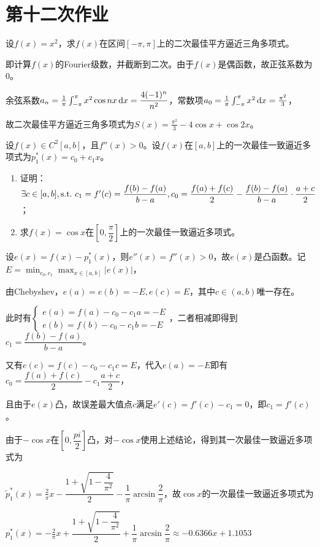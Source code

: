 \chapter{第十二次作业}

    \begin{homework}[5pts]
        设$f(x)=x^2$，求$f(x)$在区间$[-\pi,\pi]$上的二次最佳平方逼近三角多项式。
    \end{homework}

    \begin{solution}
        即计算$f(x)$的Fourier级数，并截断到二次。由于$f(x)$是偶函数，故正弦系数为0。

        余弦系数$a_n=\frac1{\pi}\int_{-\pi}^{\pi}x^2\cos nx \mathop{}\!\mathrm{d} x=\dfrac{4(-1)^n}{n^2}$，常数项$a_0=\frac1{\pi}\int_{-\pi}^{\pi}x^2\mathop{}\!\mathrm{d} x=\frac{\pi^2}{3}$，

        故二次最佳平方逼近三角多项式为$S(x)=\frac{\pi^2}3-4\cos x+\cos 2x$。
    \end{solution}

    \begin{homework}[10pts]
        设$f(x)\in C^2[a,b]$，且$f''(x)>0$。设$f(x)$在$[a,b]$上的一次最佳一致逼近多项式为$p_1^*(x)=c_0+c_1 x$。
        \begin{enumerate}
            \item 证明：$\exists c\in[a,b],\text{s.t.\,\,} c_1=f'(c)=\dfrac{f(b)-f(a)}{b-a},c_0=\dfrac{f(a)+f(c)}{2}-\dfrac{f(b)-f(a)}{b-a}\cdot\dfrac{a+c}{2}$；
            \item 求$f(x)=\cos x$在$\left[0,\dfrac{\pi}{2}\right]$上的一次最佳一致逼近多项式。
        \end{enumerate}
    \end{homework}

    \begin{solution}
        设$e(x)=f(x)-p_1^*(x)$，则$e''(x)=f''(x)>0$，故$e(x)$是凸函数。记$E=\min_{c_0,c_1}\max_{x\in[a,b]}|e(x)|$，

        由Chebyshev，$e(a)=e(b)=-E,e(c)=E$，其中$c\in(a,b)$唯一存在。

        此时有$\begin{cases}e(a)=f(a)-c_0-c_1 a=-E\\e(b)=f(b)-c_0-c_1 b=-E\end{cases}$，二者相减即得到$c_1=\dfrac{f(b)-f(a)}{b-a}$。

        又有$e(c)=f(c)-c_0-c_1 c=E$，代入$e(a)=-E$即有$c_0=\dfrac{f(a)+f(c)}{2}-c_1\dfrac{a+c}{2}$，

        且由于$e(x)$凸，故误差最大值点$c$满足$e'(c)=f'(c)-c_1=0$，即$c_1=f'(c)$。

        由于$-\cos x$在$[0,\dfrac{pi}2]$凸，对$-\cos x$使用上述结论，得到其一次最佳一致逼近多项式为

        $\tilde{p}_1^*(x)=\frac2{\pi}x-\dfrac{1+\sqrt{1-\dfrac{4}{\pi^2}}}2-\dfrac1{\pi}\arcsin \dfrac2{\pi}$，故$\cos x$的一次最佳一致逼近多项式为

        $p_1^*(x)=-\frac2{\pi}x+\dfrac{1+\sqrt{1-\dfrac{4}{\pi^2}}}2+\dfrac1{\pi}\arcsin \dfrac2{\pi}\approx -0.6366x+1.1053$
    \end{solution}

